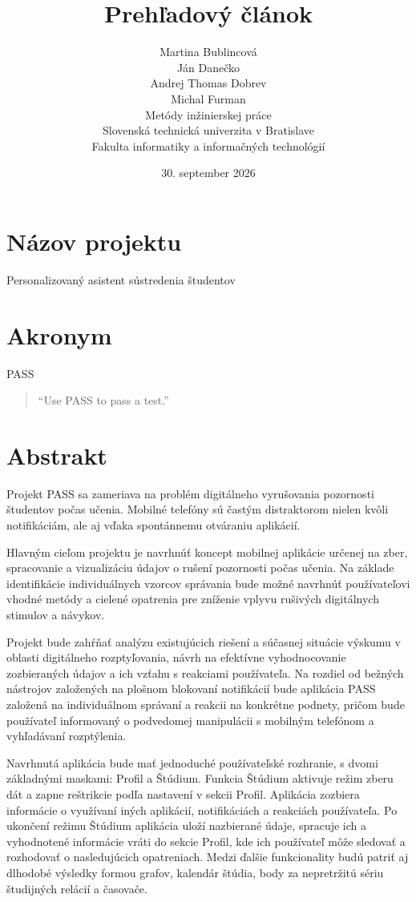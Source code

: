 \documentclass[11pt,a4paper,slovak]{article}
\title{Prehľadový článok}
\author{Martina Bublincová\\
	Ján Danečko\\
	Andrej Thomas Dobrev\\
	Michal Furman\\[6pt]
    {\small Metódy inžinierskej práce}\\
	{\small Slovenská technická univerzita v Bratislave}\\
	{\small Fakulta informatiky a informačných technológií}
}
\date{\small 30. september 2026}
\begin{document}
\maketitle
\thispagestyle{empty}
\newpage

\section{Názov projektu}

Personalizovaný asistent sústredenia študentov

\section{Akronym}

PASS

\begin{quote}
``Use PASS to pass a test.''
\end{quote}

\section*{Abstrakt}
Projekt PASS sa zameriava na problém digitálneho vyrušovania pozornosti študentov počas učenia. Mobilné telefóny sú častým distraktorom nielen kvôli notifikáciám, ale aj vďaka spontánnemu otváraniu aplikácií.

Hlavným cieľom projektu je navrhnúť koncept mobilnej aplikácie určenej na zber, spracovanie a vizualizáciu údajov o rušení pozornosti počas učenia. Na základe identifikácie individuálnych vzorcov správania bude možné navrhnúť používateľovi vhodné metódy a cielené opatrenia pre zníženie vplyvu rušivých digitálnych stimulov a návykov.

Projekt bude zahŕňať analýzu existujúcich riešení a súčasnej situácie výskumu v oblasti digitálneho rozptyľovania, návrh na efektívne vyhodnocovanie zozbieraných údajov a ich vzťahu s reakciami používateľa. Na rozdiel od bežných nástrojov založených na plošnom blokovaní notifikácií bude aplikácia PASS založená na individuálnom správaní a reakcii na konkrétne podnety, pričom bude používateľ informovaný o podvedomej manipulácii s mobilným telefónom a vyhľadávaní rozptýlenia.

Navrhnutá aplikácia bude mať jednoduché používateľské rozhranie, s dvomi základnými maskami: Profil a Štúdium. Funkcia Štúdium aktivuje režim zberu dát a zapne reštrikcie podľa nastavení v sekcii Profil. Aplikácia zozbiera informácie o využívaní iných aplikácií, notifikáciách a reakciách používateľa. Po ukončení režimu Štúdium aplikácia uloží nazbierané údaje, spracuje ich a vyhodnotené informácie vráti do sekcie Profil, kde ich používateľ môže sledovať a rozhodovať o nasledujúcich opatreniach. Medzi ďalšie funkcionality budú patriť aj dlhodobé výsledky formou grafov, kalendár štúdia, body za nepretržitú sériu študijných relácií a časovače.
\end{document}

